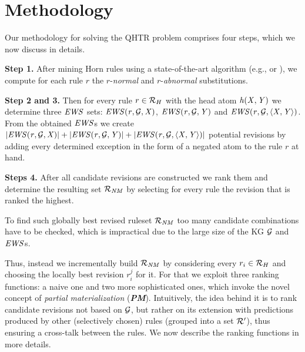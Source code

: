 \chapter{Methodology}\label{sec:meth}
 Our methodology for solving the QHTR problem comprises four steps, which we now discuss in details.
\medskip

\noindent \textbf{Step 1.} After mining Horn rules using a state-of-the-art algorithm (e.g., \cite{newrulemine} or \cite{amieplus}), we compute for each rule $r$ the $r$-\emph{normal} and $r$-\emph{abnormal} substitutions.
\medskip


\noindent \textbf{Step 2 and 3.} Then for every rule $r\in \mathcal{R}_H$ with the head atom $\mathit{h(X,Y)}$ we determine three $\mathit{EWS}$ sets: $\mathit{EWS(r,\mathcal{G},X)}$, $\mathit{EWS(r,\mathcal{G},Y)}$ and $\mathit{EWS(r,\mathcal{G},\langle X,Y\rangle)}$. From the obtained $\mathit{EWS}$s we create $|\mathit{EWS(r,\mathcal{G},X)}|+|\mathit{EWS(r,\mathcal{G},Y)}|+|\mathit{EWS(r,\mathcal{G},\langle X,Y\rangle)}|$ potential revisions by adding every determined exception in the form of a negated atom to the rule $r$ at hand.
\medskip

\noindent \textbf{Steps 4.} 
After all candidate revisions are constructed we rank them and determine the resulting set $\mathcal{R}_{\mathit{NM}}$ by selecting for every rule the revision that is ranked the highest.

To find such globally best revised ruleset $\mathcal{R}_{\mathit{NM}}$ too many candidate combinations have to be checked, which is impractical due to the large size of the KG $\mathcal{G}$ and $\mathit{EWS}$s. 

Thus, instead we incrementally build $\mathcal{R}_{\mathit{NM}}$ by considering every $r_i \in \mathcal{R}_{H}$ and choosing the locally best revision $r_i^{j}$ for it.
For that we exploit three ranking functions: a naive one and two more sophisticated ones, which invoke the novel concept of \emph{partial materialization} (\textbf{\em PM}). Intuitively, the idea behind it is to rank candidate revisions not based on $\mathcal{G}$, but rather on its extension with predictions produced by other (selectively chosen) rules (grouped into a set $\mathcal{R}'$), thus ensuring a cross-talk between the rules. We now describe the ranking functions in more details.

